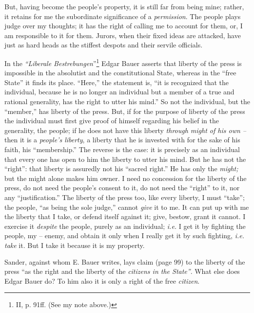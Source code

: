 \documentclass[12pt,a4paper]{book}
\begin{document}
But, having become the people's property, it is still far from being mine; 
rather, it retains for me the subordinate significance of a 
\textit{permission}. The people plays judge over my thoughts; it has the right 
of calling me to account for them, or, I am responsible to it for them. 
Jurors, when their fixed ideas are attacked, have just as hard heads as the 
stiffest despots and their servile officials.

In the \textit{``Liberale Bestrebungen}''\footnote{II, p. 91ff. (See my note 
above.)} Edgar Bauer asserts that liberty of the press is impossible in the 
absolutist and the constitutional State, whereas in the ``free State'' it 
finds its place. ``Here,'' the statement is, ``it is recognized that the 
individual, because he is no longer an individual but a member of a true and 
rational generality, has the right to utter his mind.'' So not the 
individual, but the ``member,'' has liberty of the press. But, if for the 
purpose of liberty of the press the individual must first give proof of 
himself regarding his belief in the generality, the people; if he does not 
have this liberty \textit{through might of his own --} then it is a 
\textit{people's liberty}, a liberty that he is invested with for the sake of 
his faith, his ``membership.'' The reverse is the case: it is precisely as 
an individual that every one has open to him the liberty to utter his mind. 
But he has not the ``right'': that liberty is assuredly not his ``sacred 
right.'' He has only the \textit{might;} but the might alone makes him owner. 
I need no concession for the liberty of the press, do not need the people's 
consent to it, do not need the ``right'' to it, nor any ``justification.'' 
The liberty of the press too, like every liberty, I must ``take''; the 
people, ``as being the sole judge,'' cannot \textit{give} it to me. It can 
put up with me the liberty that I take, or defend itself against it; give, 
bestow, grant it cannot. I exercise it \textit{despite} the people, purely as 
an individual; \textit{i.e.} I get it by fighting the people, my -- enemy, and 
obtain it only when I really get it by such fighting, \textit{i.e. take} it. 
But I take it because it is my property.

Sander, against whom E. Bauer writes, lays claim (page 99) to the liberty of 
the press ``as the right and the liberty of the \textit{citizens in the 
State''}. What else does Edgar Bauer do? To him also it is only a right of 
the free \textit{citizen}.
\end{document}

